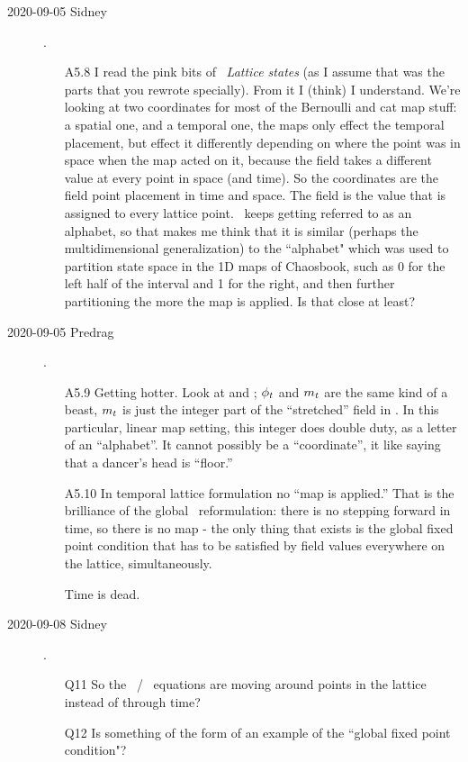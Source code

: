 \begin{description}
\item[2020-09-05 Sidney].
\begin{itemize}
	\item[A5.8]
I read the pink bits of ~{\em Lattice states} (as I
assume that was the parts that you rewrote specially). From it I (think)
I understand. We're looking at two coordinates for most of the Bernoulli
and cat map stuff: a spatial one, and a temporal one, the maps only
effect the temporal placement, but effect it differently depending on
where the point was in space when the map acted on it, because the field
takes a different value at every point in space (and time). So the
coordinates are the field point placement in time and space. The field is
the value that is assigned to every lattice point. \Mm\ keeps getting
referred to as an alphabet, so that makes me think that it is similar
(perhaps the multidimensional generalization) to the ``alphabet" which was
used to partition state space in the 1D maps of Chaosbook, such as 0 for
the left half of the interval and 1 for the right, and then further
partitioning the more the map is applied. Is that close at least?
\end{itemize}

\item[2020-09-05 Predrag].
\begin{itemize}
	\item[A5.9]
Getting hotter. Look at  and ;
$\phi_{t}$ and ${m_{t}}$ are the same kind of a beast,
${m_{t}}$ is just the integer part of the ``stretched'' field in
. In this particular, linear map setting, this integer
does double duty, as a letter of an ``alphabet''. It cannot possibly be a
``coordinate'', it like saying that a dancer's head is ``floor.''
	\item[A5.10]
In temporal lattice formulation no ``map is applied.'' That is the
brilliance of the global \spt\ reformulation: there is no stepping
forward in time, so there is no map - the only thing that exists is the
global fixed point condition that has to be satisfied by field values
everywhere on the lattice, simultaneously.

Time is dead.
\end{itemize}

\item[2020-09-08 Sidney].
\begin{itemize}
	\item[Q11]
So the \templatt\ / \catlatt\ equations are moving around points in the lattice instead of
through time?
	\item[Q12]
Is something of the form of  an example
of the ``global fixed point condition"?
\end{itemize}


\end{description}
